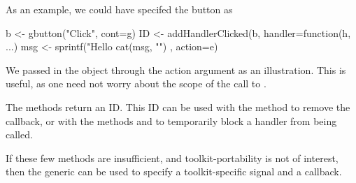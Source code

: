 As an example, we could have specifed the button as
\begin{Schunk}
\begin{Sinput}
 b <- gbutton("Click", cont=g)
 ID <- addHandlerClicked(b, handler=function(h, ...) {
   msg <- sprintf("Hello %
   cat(msg, "\n")
 }, action=e)
\end{Sinput}
\end{Schunk}
We passed in the object  through the action argument as an
illustration. This is useful, as one need not worry about the scope of the
call to .

The  methods return an ID.  This ID can be used
with the method  to remove the callback, or with
the methods  and  to
temporarily block a handler from being called.

If these few methods are insufficient, and toolkit-portability is not
of interest, then the  generic can be used to specify
a toolkit-specific signal and a callback.


